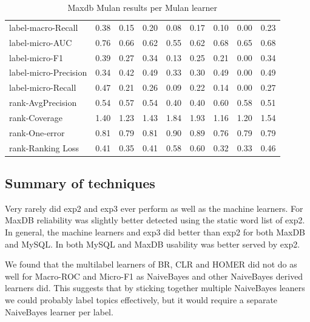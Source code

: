 \documentclass{acm_proc_article-sp}
\begin{document}
\begin{table}
\begin{tabular}{l|rrrrrrrr}
label-macro-Recall & 0.38 & 0.15 & 0.20 & 0.08 & 0.17 & 0.10 & 0.00 & 0.23 \\

label-micro-AUC & 0.76 & 0.66 & 0.62 & 0.55 & 0.62 & 0.68 & 0.65 & 0.68 \\

label-micro-F1 & 0.39 & 0.27 & 0.34 & 0.13 & 0.25 & 0.21 & 0.00 & 0.34 \\

label-micro-Precision & 0.34 & 0.42 & 0.49 & 0.33 & 0.30 & 0.49 & 0.00 & 0.49 \\

label-micro-Recall & 0.47 & 0.21 & 0.26 & 0.09 & 0.22 & 0.14 & 0.00 & 0.27 \\

rank-AvgPrecision & 0.54 & 0.57 & 0.54 & 0.40 & 0.40 & 0.60 & 0.58 & 0.51 \\

rank-Coverage & 1.40 & 1.23 & 1.43 & 1.84 & 1.93 & 1.16 & 1.20 & 1.54 \\

rank-One-error & 0.81 & 0.79 & 0.81 & 0.90 & 0.89 & 0.76 & 0.79 & 0.79 \\

rank-Ranking Loss & 0.41 & 0.35 & 0.41 & 0.58 & 0.60 & 0.32 & 0.33 & 0.46 \\

\end{tabular}

\caption{Maxdb Mulan results per Mulan learner}

\end{table}




\subsection{Summary of techniques}


Very rarely did exp2 and exp3 ever perform as well as the machine learners. For MaxDB reliability was slightly better detected using the static word list of \textsf{exp2}. In general, the machine learners and \textsf{exp3} did better than \textsf{exp2} for both MaxDB and MySQL. In both MySQL and MaxDB usability was better served by \textsf{exp2}.

We found that the multilabel learners of BR, CLR and HOMER did not do as well for Macro-ROC and Micro-F1 as NaiveBayes and other NaiveBayes derived learners did. This suggests that by sticking together multiple NaiveBayes leaners we could probably label topics effectively, but it would require a separate NaiveBayes learner per label.
\end{document}
